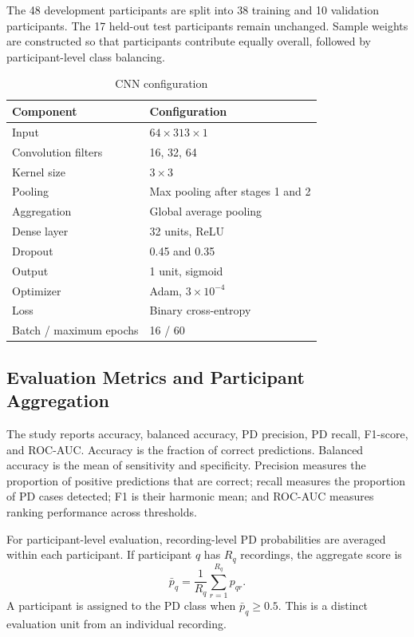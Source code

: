 \documentclass[conference]{IEEEtran}
\begin{document}
The 48 development participants are split into 38 training and 10 validation participants. The 17 held-out test participants remain unchanged. Sample weights are constructed so that participants contribute equally overall, followed by participant-level class balancing.

\begin{table}[!t]
\centering
\caption{CNN configuration}
\label{tab:cnn}
\begin{tabular}{ll}
\toprule
Component & Configuration\\
\midrule
Input & $64\times313\times1$\\
Convolution filters & 16, 32, 64\\
Kernel size & $3\times3$\\
Pooling & Max pooling after stages 1 and 2\\
Aggregation & Global average pooling\\
Dense layer & 32 units, ReLU\\
Dropout & 0.45 and 0.35\\
Output & 1 unit, sigmoid\\
Optimizer & Adam, $3\times10^{-4}$\\
Loss & Binary cross-entropy\\
Batch / maximum epochs & 16 / 60\\
\bottomrule
\end{tabular}
\end{table}

\subsection{Evaluation Metrics and Participant Aggregation}
The study reports accuracy, balanced accuracy, PD precision, PD recall, F1-score, and ROC-AUC. Accuracy is the fraction of correct predictions. Balanced accuracy is the mean of sensitivity and specificity. Precision measures the proportion of positive predictions that are correct; recall measures the proportion of PD cases detected; F1 is their harmonic mean; and ROC-AUC measures ranking performance across thresholds.

For participant-level evaluation, recording-level PD probabilities are averaged within each participant. If participant $q$ has $R_q$ recordings, the aggregate score is
\begin{equation}
\bar{p}_q=\frac{1}{R_q}\sum_{r=1}^{R_q}p_{qr}.
\end{equation}
A participant is assigned to the PD class when $\bar{p}_q\geq0.5$. This is a distinct evaluation unit from an individual recording.
\end{document}
